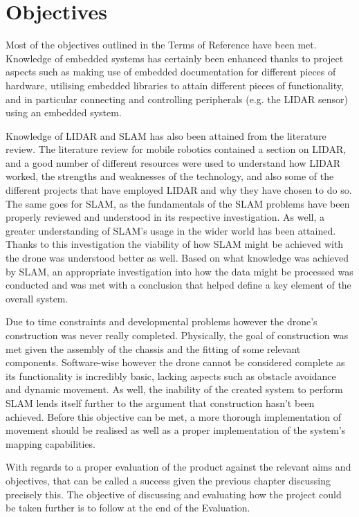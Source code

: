 	
		\section{Objectives}
		Most of the objectives outlined in the Terms of Reference have been met. Knowledge of embedded systems has certainly been enhanced thanks to project aspects such as making use of embedded documentation for different pieces of hardware, utilising embedded libraries to attain different pieces of functionality, and in particular connecting and controlling peripherals (e.g. the LIDAR sensor) using an embedded system. 
		
		Knowledge of LIDAR and SLAM has also been attained from the literature review. The literature review for mobile robotics contained a section on LIDAR, and a good number of different resources were used to understand how LIDAR worked, the strengths and weaknesses of the technology, and also some of the different projects that have employed LIDAR and why they have chosen to do so. The same goes for SLAM, as the fundamentals of the SLAM problems have been properly reviewed and understood in its respective investigation. As well, a greater understanding of SLAM's usage in the wider world has been attained. Thanks to this investigation the viability of how SLAM might be achieved with the drone was understood better as well. Based on what knowledge was achieved by SLAM, an appropriate investigation into how the data might be processed was conducted and was met with a conclusion that helped define a key element of the overall system.
		
		Due to time constraints and developmental problems however the drone's construction was never really completed. Physically, the goal of construction was met given the assembly of the chassis and the fitting of some relevant components. Software-wise however the drone cannot be considered complete as its functionality is incredibly basic, lacking aspects such as obstacle avoidance and dynamic movement. As well, the inability of the created system to perform SLAM lends itself further to the argument that construction hasn't been achieved. Before this objective can be met, a more thorough implementation of movement should be realised as well as a proper implementation of the system's mapping capabilities. 
		
		With regards to a proper evaluation of the product against the relevant aims and objectives, that can be called a success given the previous chapter discussing precisely this. The objective of discussing and evaluating how the project could be taken further is to follow at the end of the Evaluation.
		
